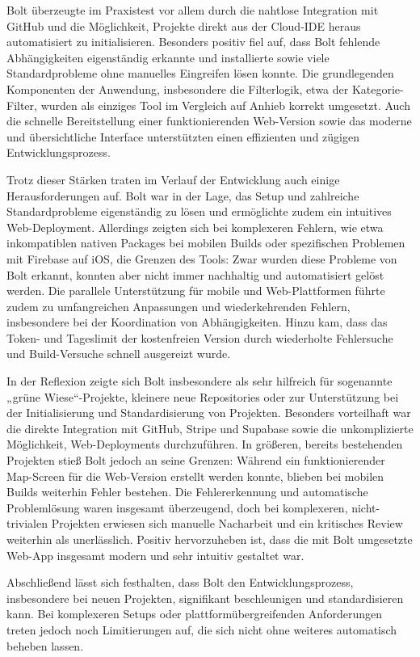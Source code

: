 Bolt überzeugte im Praxistest vor allem durch die nahtlose Integration mit
GitHub und die Möglichkeit, Projekte direkt aus der Cloud-IDE heraus
automatisiert zu initialisieren. Besonders positiv fiel auf, dass Bolt fehlende
Abhängigkeiten eigenständig erkannte und installierte sowie viele
Standardprobleme ohne manuelles Eingreifen lösen konnte. Die grundlegenden
Komponenten der Anwendung, insbesondere die Filterlogik, etwa der
Kategorie-Filter, wurden als einziges Tool im Vergleich auf Anhieb korrekt
umgesetzt. Auch die schnelle Bereitstellung einer funktionierenden Web-Version
sowie das moderne und übersichtliche Interface unterstützten einen effizienten
und zügigen Entwicklungsprozess.

Trotz dieser Stärken traten im Verlauf der Entwicklung auch einige
Herausforderungen auf. Bolt war in der Lage, das Setup und zahlreiche
Standardprobleme eigenständig zu lösen und ermöglichte zudem ein intuitives
Web-Deployment. Allerdings zeigten sich bei komplexeren Fehlern, wie etwa
inkompatiblen nativen Packages bei mobilen Builds oder spezifischen Problemen
mit Firebase auf iOS, die Grenzen des Tools: Zwar wurden diese Probleme von
Bolt erkannt, konnten aber nicht immer nachhaltig und automatisiert gelöst
werden. Die parallele Unterstützung für mobile und Web-Plattformen führte zudem
zu umfangreichen Anpassungen und wiederkehrenden Fehlern, insbesondere bei der
Koordination von Abhängigkeiten. Hinzu kam, dass das Token- und Tageslimit der
kostenfreien Version durch wiederholte Fehlersuche und Build-Versuche schnell
ausgereizt wurde.

In der Reflexion zeigte sich Bolt insbesondere als sehr hilfreich für
sogenannte „grüne Wiese“-Projekte, kleinere neue Repositories oder zur
Unterstützung bei der Initialisierung und Standardisierung von Projekten.
Besonders vorteilhaft war die direkte Integration mit GitHub, Stripe und
Supabase sowie die unkomplizierte Möglichkeit, Web-Deployments durchzuführen.
In größeren, bereits bestehenden Projekten stieß Bolt jedoch an seine Grenzen:
Während ein funktionierender Map-Screen für die Web-Version erstellt werden
konnte, blieben bei mobilen Builds weiterhin Fehler bestehen. Die
Fehlererkennung und automatische Problemlösung waren insgesamt überzeugend,
doch bei komplexeren, nicht-trivialen Projekten erwiesen sich manuelle
Nacharbeit und ein kritisches Review weiterhin als unerlässlich. Positiv
hervorzuheben ist, dass die mit Bolt umgesetzte Web-App insgesamt modern und
sehr intuitiv gestaltet war.

Abschließend lässt sich festhalten, dass Bolt den Entwicklungsprozess,
insbesondere bei neuen Projekten, signifikant beschleunigen und standardisieren
kann. Bei komplexeren Setups oder plattformübergreifenden Anforderungen treten
jedoch noch Limitierungen auf, die sich nicht ohne weiteres automatisch beheben
lassen.

